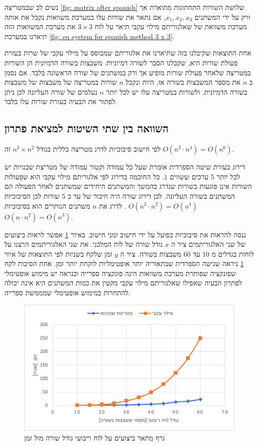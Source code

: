 \documentclass[12pt,leqno]{article}
\theoremstyle{theoremdd}
\begin{document}
נשים לב שבמטריצה 
\ref{fig: matrix after spanish}
שלושת השורות התחתונות מתוארת אך ורק על 
ידי 
המשתנים 
$x_1, x_2, x_3$,
אם נתאר את שורות עלו כמערכת משוואות נקבל
את אותה מערכת משוואת של 
שאלגוריתם מילוי עקבי תיאר על לוח 
$3 \times 3$
את מערכת המשוואות הזה תיארנו 
במערכת
\ref{fig: eq system for spanish method 3 x 3}.

אחת התוצאות שקיבלנו בזה שתיארנו את אלגוריתם שמבוסס על מילוי עקבי של שרות 
בעזרת פעולת שורות היא, שקבלנו הסבר לשורה דמיוניות.
משבצות בשורה הדמיונית 
הן השורות במטריצה
שלאחר פעולת שורות 
מופיע אך ורק במשתנים של שורה הראשונה בלבד.
אם נסמן ב
$n$
את מספר המשבצות בשורה אז,
היות ונקבל 
$n$
שורות במטריצה של משבצות של משבצות בשורה הדמיונית,
ולשורות במטריצה עלו יש לכל יותר 
$n$
נעלמים של שורה העליונה לכן ניתן לפתור את הבעיה 
בעזרת
שורות עלו בלבד.

\subsection{השוואה בין שתי השיטות למציאת פתרון}
לפי חישוב סיבוכיות
לדרג מטריצה 
כללית
בגודל 
$n^2 \times n^2$
זה 
$O(n^2 \cdot n^4) = O(n^6)$.

דירוג בעזרת שיטה הספרדית אומרת
שעל כל עמודה 
וקטור עמודה 
של מטריצת שכנויות
יש לכל יותר
$5$
ערכים ששווים 
$1$.
כל החוכמה בדירוג לפי אלגוריתם מילוי עקבי הוא 
שפעולות השורות
אינן פוגעות בשורות 
שנדרג בהמשך והמשתנים היחידים שמשתנים לאחר הפעולה הם המשתנים בשורה העליונה.
לכן דירוג שורה היה חיבור 
של עד כ
$5$
שורות
לכן הסיבוכיות 
$O(n^2 \cdot n^2) = O(n^4)$
.
לדרג את
$n$
משתנים  
הנותרים
הוא בסיבוכיות 
$O(n \cdot n^2) = O (n^3)$.

ננסה להראות את סיבוכיות בפועל על ידי חישוב זמני חישוב.
באיור 
\ref{fig:prefofmance_diagram}
אפשר לראות ביצועים
של שני האלגוריתמים ציר 
ה
$x$
גודל שורה של לוח המלבני.
את שני האלגוריתמים
הרצנו על 
לוחות בגדלים 
מ
$10$
עד 
$60$
משבצות
בשורה.
ציר ה
$y$
זמן שלקח 
בשניות
לפי התוצאות של איור 
\ref{fig:prefofmance_diagram}
ניראה 
שגישה הספרדית שבתאוריה יותר אופטימליות לוקחת יותר זמן.
אחת הסיבות לקח 
שפונקציה שפותרת מערכת משוואות הינה פונקציה ספרייה
וכנראה יש מימוש אופטימלי לפתרון הבעיה שאפילו 
שאלגוריתם מילוי עקבי מקטין את כמות 
המשתנים היא אינה יכולה להתחרות במימוש אופטימלי שמממשת ספרייה.

\begin{figure}[ht]
    \caption{ 
    גרף מתאר ביצועים על לוח ריבועי גודל שורה מול זמן
    }
    \label{fig:prefofmance_diagram}
    \centering
    \includegraphics{images/benchmark.png}
\end{figure}
\end{document}
